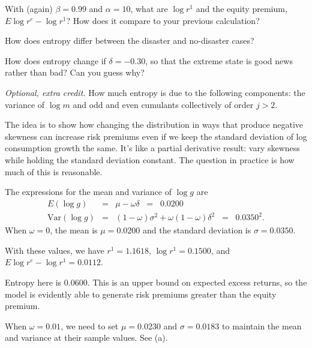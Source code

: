 \documentclass[11pt]{exam}
\begin{document}
\begin{questions}
\begin{parts}
\item With (again) $\beta = 0.99$ and $\alpha = 10$,
what are $\log r^1$ and
the equity premium,  $E \log r^e - \log r^1 $?
How does it compare to your previous calculation?

\item How does entropy differ between the
disaster and no-disaster cases?

\item How does entropy change if $\delta = - 0.30$,
so that the extreme state is good news rather than bad?
Can you guess why?

\item {\it Optional, extra credit.\/}
How much entropy is due to the following components:
the variance of $\log m$ and odd and even cumulants collectively
of order $j>2$.
\end{parts}

\begin{solution}
The idea is to show how changing the distribution
in ways that produce negative skewness can increase risk
premiums even if we keep the standard deviation of log consumption
growth the same.
It's like a partial derivative result:
vary skewness while holding the standard deviation constant.
The question in practice is how much of this is reasonable.

\begin{parts}
\item The expressions for the mean and variance of $\log g$ are
\begin{eqnarray*}
    E (\log g)   &=&  \mu - \omega \delta \;\;=\;\; 0.0200 \\
    \mbox{Var}(\log g) &=& (1-\omega) \sigma^2 + \omega (1-\omega) \delta^2
                \;\;=\;\; 0.0350^2 .
\end{eqnarray*}
When $\omega = 0$, the mean is $\mu = 0.0200$ and the standard
deviation is $\sigma = 0.0350$.

\item With these values, we have
$r^1 = 1.1618$, $\log r^1 = 0.1500$, and
$E \log r^e - \log r^1 = 0.0112 $.

\item Entropy here is 0.0600.
This is an upper bound on expected excess returns,
so the model is evidently able to generate risk premiums greater than the equity premium.

\item When $\omega = 0.01$,
we need to set $\mu = 0.0230$ and $\sigma = 0.0183$ to maintain the mean and
variance at their sample values.
See (a).


\end{parts}
\end{solution}
\end{questions}
\end{document}
